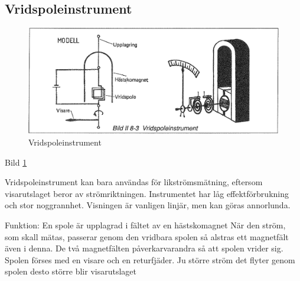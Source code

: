 \subsection{Vridspoleinstrument}

\begin{figure}
  \includegraphics[width=\textwidth]{images/bild_2_8-03}
  \caption{Vridspoleinstrument}
  \label{fig:bildII8-3}
\end{figure}

Bild \ref{fig:bildII8-3}

Vridspoleinstrument kan bara användas för likströmsmätning, eftersom
visarutslaget beror av strömriktningen. Instrumentet har låg
effektförbrukning och stor noggrannhet.  Visningen är vanligen linjär,
men kan göras annorlunda.

Funktion: En spole är upplagrad i fältet av en hästskomagnet När den
ström, som skall mätas, passerar genom den vridbara spolen så alstras
ett magnetfält även i denna. De två magnetfälten påverkarvarandra så
att spolen vrider sig. Spolen förses med en visare och en
returfjäder. Ju större ström det flyter genom spolen desto större blir
visarutslaget

